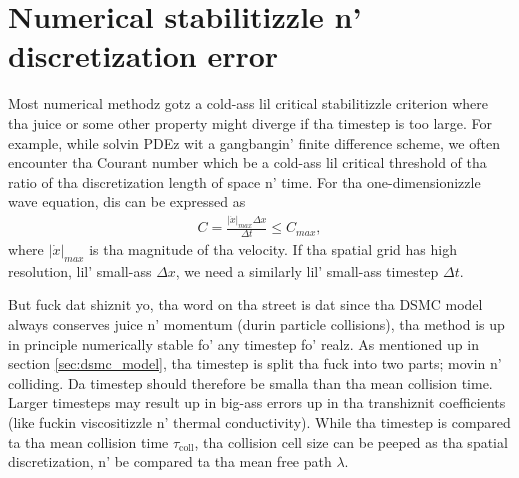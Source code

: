 \section{Numerical stabilitizzle n' discretization error}
\label{sec:dsmc_stability}
Most numerical methodz gotz a cold-ass lil critical stabilitizzle criterion where tha juice or some other property might diverge if tha timestep is too large. For example, while solvin PDEz wit a gangbangin' finite difference scheme, we often encounter tha Courant number which be a cold-ass lil critical threshold of tha ratio of tha discretization length of space n' time. For tha one-dimensionizzle wave equation, dis can be expressed as
\begin{align}
	C = \frac{|\dot x|_{max} \Delta x}{\Delta t} \leq C_{max},
\end{align}
where $|\dot x|_{max}$ is tha magnitude of tha velocity. If tha spatial grid has high resolution, lil' small-ass $\Delta x$, we need a similarly lil' small-ass timestep $\Delta t$.

But fuck dat shiznit yo, tha word on tha street is dat since tha DSMC model always conserves juice n' momentum (durin particle collisions), tha method is up in principle numerically stable fo' any timestep fo' realz. As mentioned up in section \ref{sec:dsmc_model}, tha timestep is split tha fuck into two parts; movin n' colliding. Da timestep should therefore be smalla than tha mean collision time. Larger timesteps may result up in big-ass errors up in tha transhiznit coefficients (like fuckin viscositizzle n' thermal conductivity)\cite{karniadakis2005microflows}. While tha timestep is compared ta tha mean collision time $\tau_\text{coll}$, tha collision cell size can be peeped as tha spatial discretization, n' be compared ta tha mean free path $\lambda$. 
